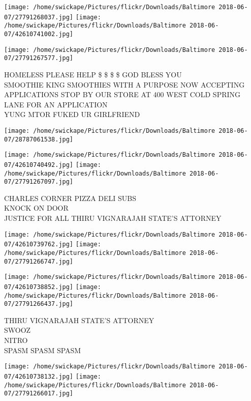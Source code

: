 \documentclass[10pt,letterpaper]{article}
\begin{document}
\texttt{[image: /home/swickape/Pictures/flickr/Downloads/Baltimore 2018-06-07/27791268037.jpg]}
\texttt{[image: /home/swickape/Pictures/flickr/Downloads/Baltimore 2018-06-07/42610741002.jpg]}

\texttt{[image: /home/swickape/Pictures/flickr/Downloads/Baltimore 2018-06-07/27791267577.jpg]}

HOMELESS PLEASE HELP \$ \$ \$ \$ GOD BLESS YOU\\
SMOOTHIE KING SMOOTHIES WITH A PURPOSE NOW ACCEPTING APPLICATIONS STOP BY OUR STORE AT 400 WEST COLD SPRING LANE FOR AN APPLICATION\\
YUNG MTOR FUKED UR GIRLFRIEND\\
\pagebreak

\texttt{[image: /home/swickape/Pictures/flickr/Downloads/Baltimore 2018-06-07/28787061538.jpg]}

\vspace{0.25in}
\texttt{[image: /home/swickape/Pictures/flickr/Downloads/Baltimore 2018-06-07/42610740492.jpg]}
\texttt{[image: /home/swickape/Pictures/flickr/Downloads/Baltimore 2018-06-07/27791267097.jpg]}

CHARLES CORNER PIZZA DELI SUBS\\
KNOCK ON DOOR\\
JUSTICE FOR ALL THIRU VIGNARAJAH STATE'S ATTORNEY\\
\pagebreak

\texttt{[image: /home/swickape/Pictures/flickr/Downloads/Baltimore 2018-06-07/42610739762.jpg]}
\texttt{[image: /home/swickape/Pictures/flickr/Downloads/Baltimore 2018-06-07/27791266747.jpg]}

\texttt{[image: /home/swickape/Pictures/flickr/Downloads/Baltimore 2018-06-07/42610738852.jpg]}
\texttt{[image: /home/swickape/Pictures/flickr/Downloads/Baltimore 2018-06-07/27791266437.jpg]}

THIRU VIGNARAJAH STATE'S ATTORNEY\\
SWOOZ\\
NITRO\\
SPASM SPASM SPASM\\
\pagebreak

\texttt{[image: /home/swickape/Pictures/flickr/Downloads/Baltimore 2018-06-07/42610738132.jpg]}
\texttt{[image: /home/swickape/Pictures/flickr/Downloads/Baltimore 2018-06-07/27791266017.jpg]}
\end{document}
